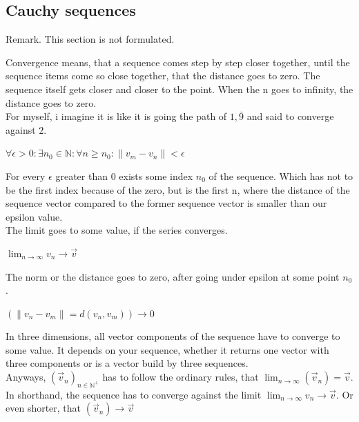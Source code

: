 \documentclass[a4paper]{article}
\begin{document}
\begin{Example}
\subsection{Cauchy sequences}

Remark. This section is not formulated.

Convergence means, that a sequence comes step by step closer together, until the sequence items come so close together, that the distance goes to zero. The sequence itself gets closer and closer to the point. When the n goes to infinity, the distance goes to zero.\\

For myself, i imagine it is like it is going the path of $1,\bar{9}$ and said to converge against $2$.\\

\begin{center}
$\forall \epsilon > 0 : \exists n_{0} \in \mathbb{N} : \forall n \geq n_{0} : \|v_{m}-v_{n}\| < \epsilon$
\end{center}

For every $\epsilon$ greater than 0 exists some index $n_{0}$ of the sequence. Which has not to be the first index because of the zero,
but is the first n, where the distance of the sequence vector compared to the former sequence vector is smaller than our epsilon value.\\

The limit goes to some value, if the series converges.\\

\begin{center}
$\lim\nolimits_{n\rightarrow\infty} v_{n} \rightarrow \vec{v}$\\
\end{center}

The norm or the distance goes to zero, after going under epsilon at some point $n_{0}$.

\begin{center}
$(\|v_{n}-v_{m}\| = d(v_{n},v_{m})) \rightarrow 0$
\end{center}


In three dimensions, all vector components of the sequence have to converge to some value. It depends on your sequence, whether it returns one vector with three components or is a vector build by three sequences.\\

 Anyways, $(\vec{v}_{n})_{n \in \mathbb{N}^{+} }$ has to follow the ordinary rules, that $\lim_{n\rightarrow\infty}(\vec{v}_{n}) = \vec{v}$. In shorthand, the sequence has to converge against the limit $\lim_{n\rightarrow\infty}v_{n}\rightarrow\vec{v}$. Or even shorter, that $(\vec{v}_{n}) \rightarrow \vec{v}$\\


\end{Example}
\end{document}
